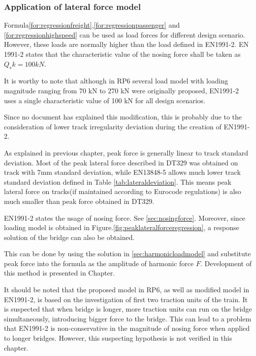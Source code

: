 \subsubsection{Application of lateral force model}
Formula\ref{for:regressionfreight},\ref{for:regressionpassenger} and \ref{for:regressionhighspeed} can be used as load forces for different design scenario. However, these loads are normally higher than the load defined in EN1991-2\cite[6.5.2 Nosing force]{EC12}. EN 1991-2 states that the characteristic value of the nosing force shall be taken as $Q_sk = 100 kN$. 

It is worthy to note that although in RP6\cite[Proposed criteria]{d181} several load model with loading magnitude ranging from 70 kN to 270 kN were originally proposed, EN1991-2 uses a single characteristic value of 100 kN for all design scenarios. 


Since no document has explained this modification, this is probably due to the consideration of lower track irregularity deviation during the creation of EN1991-2.

As explained in previous chapter, peak force is generally linear to track standard deviation. Most of the peak lateral force described in DT329 was obtained on track with 7mm standard deviation, while EN13848-5\cite{13848} allows much lower track standard deviation defined in Table \ref{tab:lateraldeviation}. This means peak lateral force on tracks(if maintained according to Eurocode regulations) is also much smaller than peak force obtained in DT329. 

EN1991-2 states the usage of nosing force. See \ref{sec:nosingforce}. Moreover, since loading model is obtained in Figure.\ref{fig:peaklateralforceregression}, a response solution of the bridge can also be obtained. 

This can be done by using the solution in \ref{sec:harmonicloadmodel} and substitute peak force into the formula as the amplitude of harmonic force $F$. Development of this method is presented in Chapter. 
 
It should be noted that the proposed model in RP6, as well as modified model in EN1991-2, is based on the investigation of first two traction units of the train. It is suspected that when bridge is longer, more traction units can run on the bridge simultaneously, introducing bigger force to the bridge. This can lead to a problem that EN1991-2 is non-conservative in the magnitude of nosing force when applied to longer bridges. However, this suspecting hypothesis is not verified in this chapter.  


